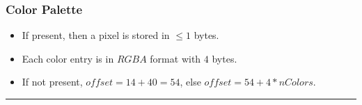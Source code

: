 \subsubsection{Color Palette}
\begin{itemize}
  \item If present, then a pixel is stored in $\leq 1$ bytes.
  \item Each color entry is in $RGBA$ format with $4$ bytes.
  \item If not present, $offset = 14+40 =54$, else $offset=54+4*nColors$.
\end{itemize}
\hrule

